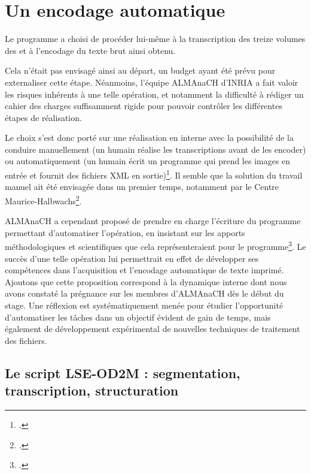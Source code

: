 \chapter{Un encodage automatique}

Le programme \timeus{} a choisi de procéder lui-même à la transcription des treize volumes des \odm{} et à l'encodage du texte brut ainsi obtenu. 

Cela n'était pas envisagé ainsi au départ, un budget ayant été prévu pour externaliser cette étape. Néanmoins, l'équipe ALMAnaCH d'INRIA a fait valoir les risques inhérents à une telle opération, et notamment la difficulté à rédiger un cahier des charges suffisamment rigide pour pouvoir contrôler les différentes étapes de réalisation.

Le choix s'est donc porté sur une réalisation en interne avec la possibilité de la conduire manuellement (un humain réalise les transcriptions avant de les encoder) ou automatiquement (un humain écrit un programme qui prend les images en entrée et fournit des fichiers XML en sortie)\footcite[p. 52]{chague}. Il semble que la solution du travail manuel ait été envisagée dans un premier temps, notamment par le Centre Maurice-Halbwachs\footcite[p. 52]{chague}. 

ALMAnaCH a cependant proposé de prendre en charge l'écriture du programme permettant d'automatiser l'opération, en insistant sur les apports méthodologiques et scientifiques que cela représenteraient pour le programme\footcite[p. 52]{chague}. Le succès d'une telle opération lui permettrait en effet de développer ses compétences dans l'acquisition et l'encodage automatique de texte imprimé. Ajoutons que cette proposition correspond à la dynamique interne dont nous avons constaté la prégnance sur les membres d'ALMAnaCH dès le début du stage. Une réflexion est systématiquement menée pour étudier l'opportunité d'automatiser les tâches dans un objectif évident de gain de temps, mais également de développement expérimental de nouvelles techniques de traitement des fichiers.

\section[Le script LSE-OD2M]{Le script \textsc{LSE-OD2M} : segmentation, transcription, structuration}